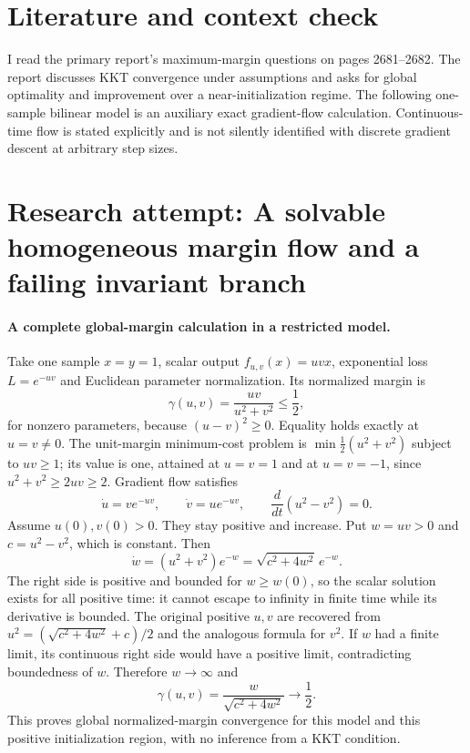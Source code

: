 \documentclass[11pt]{article}
\begin{document}
\section{Literature and context check}

I read the primary report's maximum-margin questions on pages 2681--2682.
The report discusses KKT convergence under assumptions and asks for global
optimality and improvement over a near-initialization regime. The following
one-sample bilinear model is an auxiliary exact gradient-flow calculation.
Continuous-time flow is stated explicitly and is not silently identified with
discrete gradient descent at arbitrary step sizes.

\section{Research attempt: A solvable homogeneous margin flow and a failing invariant branch}

\paragraph{A complete global-margin calculation in a restricted model.}
Take one sample $x=y=1$, scalar output $f_{u,v}(x)=uvx$, exponential loss
$L=e^{-uv}$ and Euclidean parameter normalization. Its normalized margin is
\[
 \gamma(u,v)=\frac{uv}{u^2+v^2}\leq\frac12,
\]
for nonzero parameters, because $(u-v)^2\geq0$. Equality holds exactly at
$u=v\ne0$. The unit-margin minimum-cost problem is
$\min\frac12(u^2+v^2)$ subject to $uv\geq1$; its value is one, attained
at $u=v=1$ and at $u=v=-1$, since $u^2+v^2\geq2uv\geq2$.
Gradient flow satisfies
\[
 \dot u=v e^{-uv},\qquad\dot v=u e^{-uv},\qquad
 \frac{d}{dt}(u^2-v^2)=0.
\]
Assume $u(0),v(0)>0$. They stay positive and increase. Put $w=uv>0$ and
$c=u^2-v^2$, which is constant. Then
\[
 \dot w=(u^2+v^2)e^{-w}=\sqrt{c^2+4w^2}\,e^{-w}.
\]
The right side is positive and bounded for $w\geq w(0)$, so the scalar
solution exists for all positive time: it cannot escape to infinity in finite
time while its derivative is bounded. The original positive $u,v$ are recovered
from $u^2=(\sqrt{c^2+4w^2}+c)/2$ and the analogous formula for $v^2$.
If $w$ had a finite limit, its continuous right side would have a positive
limit, contradicting boundedness of $w$. Therefore $w\to\infty$ and
\[
 \gamma(u,v)=\frac{w}{\sqrt{c^2+4w^2}}\longrightarrow\frac12.
\]
This proves global normalized-margin convergence for this model and this
positive initialization region, with no inference from a KKT condition.
\end{document}
